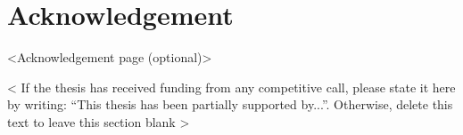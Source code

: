 %
\section*{Acknowledgement}
\label{sec::acknowledgement}


<Acknowledgement page (optional)>

\vspace{\fill}
\begin{spacing}{1.0}
< If the thesis has received funding from any competitive call, please state it here by writing: “This thesis has been partially supported by...”. Otherwise, delete this text to leave this section blank >
\end{spacing}




